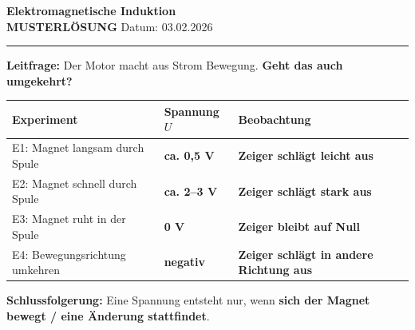 \documentclass[11pt,a4paper]{article}
\newcommand{\lsg}[1]{\textcolor{loesung}{\textbf{#1}}}
\begin{document}
\begin{minipage}[t]{0.80\textwidth}
    \vspace{0pt}
    {\Large\bfseries Elektromagnetische Induktion}\\[0.2em]
    {\small\textcolor{loesung}{\textbf{MUSTERLÖSUNG}} \hfill Datum: 03.02.2026}
\end{minipage}
\vspace{0.1em}
\hrule
\vspace{0.4em}

\begin{merkkasten}
\textbf{Leitfrage:} Der Motor macht aus Strom Bewegung. \textbf{Geht das auch umgekehrt?}
\end{merkkasten}

\vspace{0.3em}

\begin{protokollbox}[title=Kasten 1: Simulationsexperiment -- Protokoll]
\small
\renewcommand{\arraystretch}{1.25}
\begin{tabular}{|>{\raggedright\arraybackslash}p{4.2cm}|p{2.2cm}|p{7.5cm}|}
\hline
\textbf{Experiment} & \textbf{Spannung $U$} & \textbf{Beobachtung} \\
\hline
E1: Magnet langsam durch Spule & \lsg{ca. 0,5 V} & \lsg{Zeiger schlägt leicht aus} \\[0.15cm]
\hline
E2: Magnet schnell durch Spule & \lsg{ca. 2--3 V} & \lsg{Zeiger schlägt stark aus} \\[0.15cm]
\hline
E3: Magnet ruht in der Spule & \lsg{0 V} & \lsg{Zeiger bleibt auf Null} \\[0.15cm]
\hline
E4: Bewegungsrichtung umkehren & \lsg{negativ} & \lsg{Zeiger schlägt in andere Richtung aus} \\[0.15cm]
\hline
\end{tabular}

\vspace{0.3em}
\textbf{Schlussfolgerung:} Eine Spannung entsteht nur, wenn \lsg{sich der Magnet bewegt / eine Änderung stattfindet}.
\end{protokollbox}
\end{document}
